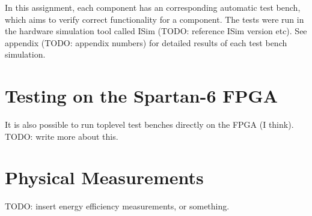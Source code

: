 In this assignment, each component has an corresponding automatic test bench, which aims to verify correct functionality for a component.
The tests were run in the hardware simulation tool called ISim (TODO: reference ISim version etc).
See appendix (TODO: appendix numbers) for detailed results of each test bench simulation.

\section{Testing on the Spartan-6 FPGA}

It is also possible to run toplevel test benches directly on the FPGA (I think).
TODO: write more about this.

\section{Physical Measurements}

TODO: insert energy efficiency measurements, or something.

